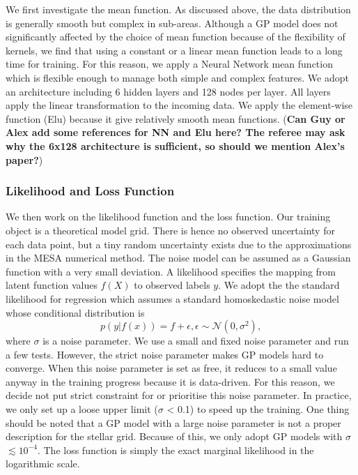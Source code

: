 We first investigate the mean function. As discussed above, the data distribution is generally smooth but complex in sub-areas. Although a GP model does not significantly affected by the choice of mean function because of the flexibility of kernels, we find that using a constant or a linear mean function leads to a long time for training. For this reason, we apply a Neural Network mean function which is flexible enough to manage both simple and complex features. We adopt an architecture including 6 hidden layers and 128 nodes per layer. All layers apply the linear transformation to the incoming data. We apply the element-wise function (Elu) because it give relatively smooth mean functions. ({\bf Can Guy or Alex add some references for NN and Elu here? The referee may ask why the 6x128 architecture is sufficient, so should we mention Alex's paper?})

\subsubsection{Likelihood and Loss Function}

We then work on the likelihood function and the loss function. Our training object is a theoretical model grid. There is hence no observed uncertainty for each data point, but a tiny random uncertainty exists due to the approximations in the \textsc{MESA} numerical method. The noise model can be assumed as a Gaussian function with a very small deviation. 
%   
A likelihood specifies the mapping from latent function values $f(X)$ to observed labels $y$.
We adopt the the standard likelihood for regression which assumes a standard homoskedastic noise model whose conditional distribution is
\begin{equation}\label{eq:likelihood}
p(y|f(x)) = f + \epsilon, \epsilon \sim \mathcal{N}(0, \sigma^{2}),
\end{equation}
where $\sigma$ is a noise parameter. 
%
We use a small and fixed noise parameter and run a few tests. However, the strict noise parameter makes GP models hard to converge. When this noise parameter is set as free, it reduces to a small value anyway in the training progress because it is data-driven. For this reason, we decide not put strict constraint for or prioritise this noise parameter. In practice, we only set up a loose upper limit ($\sigma$  < 0.1) to speed up the training. One thing should be noted that a GP model with a large noise parameter is not a proper description for the stellar grid. Because of this, we only adopt GP models with $\sigma$ $\lesssim 10^{-4}$.   
The loss function is simply the exact marginal likelihood in the logarithmic scale.

